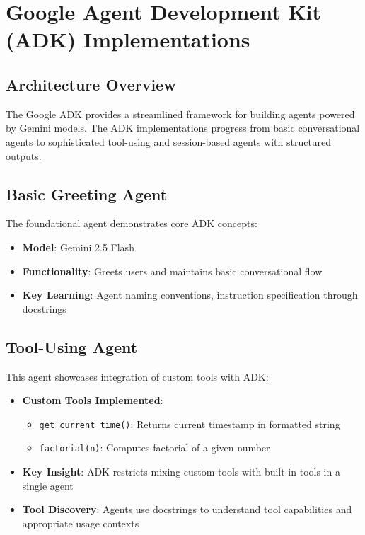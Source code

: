 \documentclass[12pt,a4paper]{article}
\begin{document}
\section{Google Agent Development Kit (ADK) Implementations}

\subsection{Architecture Overview}

The Google ADK provides a streamlined framework for building agents powered by Gemini models. The ADK implementations progress from basic conversational agents to sophisticated tool-using and session-based agents with structured outputs.

\subsection{Basic Greeting Agent}

The foundational agent demonstrates core ADK concepts:
\begin{itemize}
    \item \textbf{Model}: Gemini 2.5 Flash
    \item \textbf{Functionality}: Greets users and maintains basic conversational flow
    \item \textbf{Key Learning}: Agent naming conventions, instruction specification through docstrings
\end{itemize}

\subsection{Tool-Using Agent}

This agent showcases integration of custom tools with ADK:
\begin{itemize}
    \item \textbf{Custom Tools Implemented}:
    \begin{itemize}
        \item \texttt{get\_current\_time()}: Returns current timestamp in formatted string
        \item \texttt{factorial(n)}: Computes factorial of a given number
    \end{itemize}
    \item \textbf{Key Insight}: ADK restricts mixing custom tools with built-in tools in a single agent
    \item \textbf{Tool Discovery}: Agents use docstrings to understand tool capabilities and appropriate usage contexts
\end{itemize}
\end{document}
